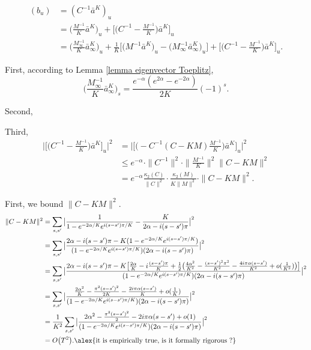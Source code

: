 \begin{align*}
    (b_u) &= (C^{-1}\bar{a}^K)_u\\
    &= \big(\frac{M^{-1}}{K}\bar{a}^K\big)_u + \big[\big( C^{-1} - \frac{M^{-1}}{K}\big)\bar{a}^K\big]_u\\
    &= \big(\frac{M^{-1}_{\infty}}{K}\bar{a}_\infty^K\big)_u + \frac{1}{K}\big[\big(M^{-1}\bar{a}^K\big)_u - \big(M^{-1}_\infty \bar{a}_\infty^K\big)_u\big] + \big[\big( C^{-1} - \frac{M^{-1}}{K}\big)\bar{a}^K\big]_u.
\end{align*}

First, according to Lemma \ref{lemma eigenvector Toeplitz},
\[
\big(\frac{M^{-1}_{\infty}}{K}\bar{a}_\infty^K\big)_s= \frac{e^{-\alpha}(e^{2\alpha} - e^{-2\alpha})}{2K}(-1)^s.
\]

Second, 

Third, \begin{align*}
    \big\vert\big[\big( C^{-1} - \frac{M^{-1}}{K}\big)\bar{a}^K\big]_u\big\vert^2    &=\big\vert\big[\big(-C^{-1}(C - KM)\frac{M^{-1}}{K}\big)\bar{a}^K\big]_u\big\vert^2\\
    &\leq e^{-\alpha}\cdot\| C^{-1}\|^2\cdot\|\frac{M^{-1}}{K}\|^2\| C-KM\|^2\\
    &= e^{-\alpha}\frac{\kappa_2(C)}{\| C\|^2}\cdot\frac{\kappa_2(M)}{K\| M\|^2}\cdot\| C - KM\|^2.
\end{align*}

First, we bound $\| C-KM\|^2$.
\begin{align*}
    \| C - KM\|^2 &= \sum_{s, s'}\big\vert\frac{1}{1-e^{-2\alpha/K}e^{i(s-s')\pi/K}} - \frac{K}{2\alpha - i(s-s')\pi}\big\vert^2\\
    &= \sum_{s, s'}\big\vert \frac{2\alpha -i(s-s')\pi - K(1 - e^{-2\alpha/K}e^{i(s-s')\pi/K})}{(1-e^{-2\alpha/K}e^{i(s-s')\pi/K})(2\alpha - i(s-s')\pi)}\big\vert^2\\
    &= \sum_{s, s'}\big\vert\frac{2\alpha - i(s-s')\pi - K\big[\frac{2\alpha}{K} -i\frac{(s-s')\pi}{K} + \frac{1}{2}\big(\frac{4\alpha^2}{K^2} - \frac{(s-s')^2\pi^2}{K^2} -\frac{4i\pi\alpha(s-s')}{K^2} + o(\frac{1}{K^2})\big)\big]}{(1-e^{-2\alpha/K}e^{i(s-s')\pi/K})(2\alpha - i(s-s')\pi)}\big\vert^2\\
    &=\sum_{s, s'}\big\vert\frac{\frac{2\alpha^2}{K} - \frac{\pi^2(s-s')^2}{2K} - \frac{2i\pi\alpha(s-s')}{K} + o(\frac{1}{K})}{(1-e^{-2\alpha/K}e^{i(s-s')\pi/K})(2\alpha - i(s-s')\pi)}\big\vert^2\\
    &=\frac{1}{K^2}\sum_{s, s'}\big\vert\frac{2\alpha^2 - \frac{\pi^2(s-s')^2}{2} - 2i\pi\alpha(s-s') + o(1)}{(1-e^{-2\alpha/K}e^{i(s-s')\pi/K})(2\alpha - i(s-s')\pi)}\big\vert^2\\
    &= O\big(T^2\big). \text{\alex{it is empirically true, is it formally rigorous ?}}
\end{align*}


